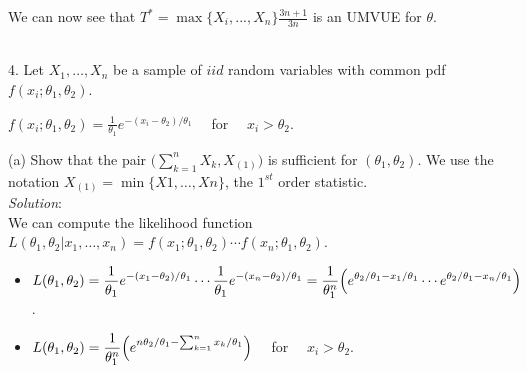 \documentclass[12pt]{article}
\newcommand{\XB}{\color{black}}
\newcommand{\XBB}{\color{blue}}
\newcommand{\ds}{\displaystyle}
\begin{document}
\noindent
We can now see that $ \ds T^{*} = \max\{X_{i},...,X_{n}\} \frac{3n+1}{3n} $ is an UMVUE for $ \theta $. \\

\vspace{2.5mm}

\newpage
\XBB\hrulefill\XB \\

4. Let $ X_{1},\dots,X_{n} $ be a sample of $ iid $ random variables with common pdf $ f(x_{i}; \theta_{1}, \theta_{2}) $. \\

\begin{center}
    $ \ds f(x_{i}; \theta_{1}, \theta_{2}) = \frac{1}{\theta_{1}}e^{-(x_{i} - \theta_{2}) / \theta_{1}} \quad $ for $ \quad  x_{i} > \theta_{2} $. 
\end{center}

\XBB\hrulefill\XB 
\vspace{5mm} 

(a) Show that the pair $ \ds \bigl( \sum_{k=1}^{n} X_{k} , X_{(1)} \bigr) $ is sufficient for $ (\theta_{1}, \theta_{2}) $. We use the notation $ X_{(1)} = \min\{ X{1}, \dots, X{n} \} $, the $1^{st}$ order statistic.
\vspace{2.5mm} \\
\textit{Solution}:
\vspace{2.5mm} \\

\noindent
We can compute the likelihood function $ L(\theta_{1}, \theta_{2} | x_{1}, \dots, x_{n}) = f(x_{1}; \theta_{1}, \theta_{2}) \cdots f(x_{n}; \theta_{1}, \theta_{2}) $. 

\begin{itemize}
    \item $ \ds L(\theta_{1}, \theta_{2}) = \frac{1}{\theta_{1}}e^{-(x_{1} - \theta_{2}) / \theta_{1}} \cdots \frac{1}{\theta_{1}}e^{-(x_{n} - \theta_{2}) / \theta_{1}} = \frac{1}{\theta_{1}^{n}} \Bigl( e^{\theta_{2} / \theta_{1} - x_{1} / \theta_{1}} \cdots  e^{\theta_{2} / \theta_{1} - x_{n} / \theta_{1}} \Bigr) $.
    \item $ \ds L(\theta_{1}, \theta_{2}) = \frac{1}{\theta_{1}^{n}} \Bigl( e^{n \theta_{2} / \theta_{1} - \sum_{k=1}^{n} x_{k} / \theta_{1}} \Bigr) \quad $ for $ \quad  x_{i} > \theta_{2} $.
\end{itemize}
\end{document}
